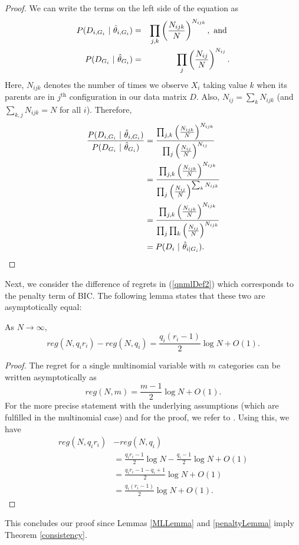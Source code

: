 \begin{proof}
We can write the terms on the left side of the equation as
\begin{eqnarray*}
P(D_{i, G_i} \ | \ \hat{\theta}_{i, G_i}) &=& \prod_{j,k} \left( \frac{N_{ijk}}{N}  \right)^{N_{ijk}}, \text{ and }\\
P(D_{G_i} \ | \ \hat{\theta}_{G_i} ) &=&  \prod_{j} \left( \frac{N_{ij}}{N}  \right)^{N_{ij}}.
\end{eqnarray*}
Here, $N_{ijk}$ denotes the number of times we observe $X_i$ taking value $k$ when its parents are in $j^\text{th}$ configuration in our data matrix $D$. Also, $N_{ij} = \sum_k N_{ijk}$ (and $\sum_{k,j}N_{ijk} = N$ for all $i$).
Therefore,
\begin{align*}
\frac{P(D_{i, G_i} \ | \ \hat{\theta}_{i, G_i} )}{P(D_{G_i} \ | \ \hat{\theta}_{G_i} )} &= \frac{ \prod_{j,k} \left( \frac{N_{ijk}}{N}  \right)^{N_{ijk}}}{\prod_{j} \left( \frac{N_{ij}}{N}  \right)^{N_{ij}}} \\
&= \frac{ \prod_{j,k} \left( \frac{N_{ijk}}{N}  \right)^{N_{ijk}}}{\prod_{j} \left( \frac{N_{ij}}{N}  \right)^{\sum_k N_{ijk}}} \\
&= \frac{ \prod_{j,k} \left( \frac{N_{ijk}}{N}  \right)^{N_{ijk}}}{\prod_{j}\prod_{k} \left( \frac{N_{ij}}{N}  \right)^{N_{ijk}}}\\
&= P(D_i \ | \ \hat{\theta}_{i | G_i} ).
\end{align*} 

\end{proof}
Next, we consider the difference of regrets in
(\ref{qnmlDef2}) which corresponds to the penalty term of BIC. The
following lemma states that these two are asymptotically equal:

\begin{lemma}\label{penaltyLemma}
As $N \to \infty$,
$$reg(N,q_i r_i) - reg(N,q_i) = \frac{q_i(r_i - 1)}{2}\log N + O(1).$$   
\end{lemma}
\begin{proof}
The regret
for a single multinomial variable with $m$ categories can be written
asymptotically as
\begin{equation}\label{regretAsymp}
reg(N,m) = \frac{m-1}{2}\log N + O(1).
\end{equation}
For the more precise statement with the underlying assumptions (which are fulfilled in the multinomial case) and for the proof, we refer to \cite{Riss96a, Grun07}. Using this, we have
\begin{align*}
reg(N,q_i r_i)& -  reg(N,q_i) \\ 
&= \frac{q_ir_i-1}{2}\log N-\frac{q_i-1}{2}\log N + O(1) \\
&= \frac{q_ir_i-1-q_i + 1}{2}\log N + O(1) \\
&= \frac{q_i(r_i - 1)}{2} \log N + O(1).
\end{align*}
\end{proof}
This concludes our proof since Lemmas \ref{MLLemma} and
\ref{penaltyLemma} imply Theorem \ref{consistency}.



